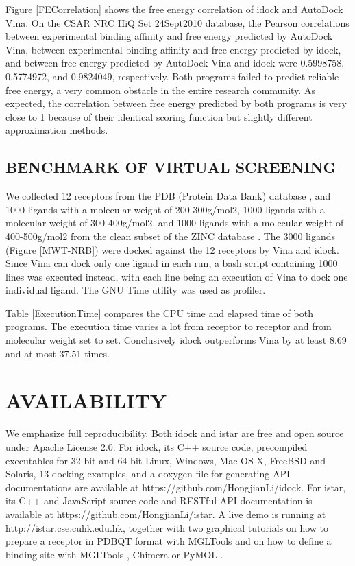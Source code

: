 \documentclass[12pt]{article}
\begin{document}
Figure \ref{FECorrelation} shows the free energy correlation of idock and AutoDock Vina. On the CSAR NRC HiQ Set 24Sept2010 database, the Pearson correlations between experimental binding affinity and free energy predicted by AutoDock Vina, between experimental binding affinity and free energy predicted by idock, and between free energy predicted by AutoDock Vina and idock were 0.5998758, 0.5774972, and 0.9824049, respectively. Both programs failed to predict reliable free energy, a very common obstacle in the entire research community. As expected, the correlation between free energy predicted by both programs is very close to 1 because of their identical scoring function but slightly different approximation methods.

\subsection*{\sffamily \large BENCHMARK OF VIRTUAL SCREENING}

We collected 12 receptors from the PDB (Protein Data Bank) database \cite{540,537}, and 1000 ligands with a molecular weight of 200-300g/mol2, 1000 ligands with a molecular weight of 300-400g/mol2, and 1000 ligands with a molecular weight of 400-500g/mol2 from the clean subset of the ZINC database \cite{532,1178}. The 3000 ligands (Figure \ref{MWT-NRB}) were docked against the 12 receptors by Vina and idock. Since Vina can dock only one ligand in each run, a bash script containing 1000 lines was executed instead, with each line being an execution of Vina to dock one individual ligand. The GNU Time utility was used as profiler.

Table \ref{ExecutionTime} compares the CPU time and elapsed time of both programs. The execution time varies a lot from receptor to receptor and from molecular weight set to set. Conclusively idock outperforms Vina by at least 8.69 and at most 37.51 times.

\section*{\sffamily \Large AVAILABILITY}

We emphasize full reproducibility. Both idock and istar are free and open source under Apache License 2.0. For idock, its C++ source code, precompiled executables for 32-bit and 64-bit Linux, Windows, Mac OS X, FreeBSD and Solaris, 13 docking examples, and a doxygen file for generating API documentations are available at https://github.com/HongjianLi/idock. For istar, its C++ and JavaScript source code and RESTful API documentation is available at https://github.com/HongjianLi/istar. A live demo is running at http://istar.cse.cuhk.edu.hk, together with two graphical tutorials on how to prepare a receptor in PDBQT format with MGLTools \citep{596} and on how to define a binding site with MGLTools \citep{596}, Chimera \citep{1219} or PyMOL \citep{1221}.
\end{document}
